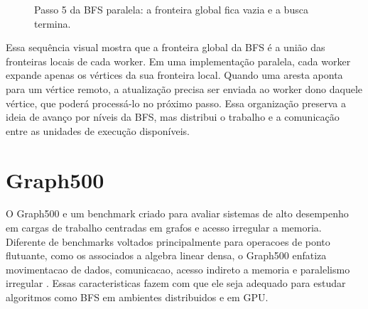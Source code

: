 \documentclass{article}
\begin{document}
\begin{figure}[H]
\centering
{}
\caption{Passo 5 da BFS paralela: a fronteira global fica vazia e a busca termina.}
\label{fig:bfs-paralela-step5}
\end{figure}

Essa sequência visual mostra que a fronteira global da BFS é a união das
fronteiras locais de cada worker. Em uma implementação paralela, cada worker
expande apenas os vértices da sua fronteira local. Quando uma aresta aponta para
um vértice remoto, a atualização precisa ser enviada ao worker dono daquele
vértice, que poderá processá-lo no próximo passo. Essa organização preserva a
ideia de avanço por níveis da BFS, mas distribui o trabalho e a comunicação entre
as unidades de execução disponíveis.

\section{Graph500}
O Graph500 e um benchmark criado para avaliar sistemas de alto desempenho em
cargas de trabalho centradas em grafos e acesso irregular a memoria. Diferente
de benchmarks voltados principalmente para operacoes de ponto flutuante, como os
associados a algebra linear densa, o Graph500 enfatiza movimentacao de dados,
comunicacao, acesso indireto a memoria e paralelismo irregular
\cite{murphygraph500}. Essas caracteristicas fazem com que ele seja adequado
para estudar algoritmos como BFS em ambientes distribuidos e em GPU.
\end{document}
